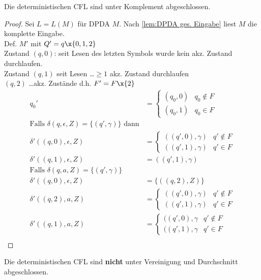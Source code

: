 \begin{Satz}[name={[Abgeschlossenheit der deterministischen \acs*{CFL}]}]
	Die deterministischen \ac{CFL} sind unter Komplement abgeschlossen.
\end{Satz}
\begin{proof}
	Sei $L=L(M)$ für \ac{DPDA} $M$. Nach \autoref{lem:DPDA ges. Eingabe} liest $M$ die komplette Eingabe.\\
	Def. $M'$ mit $Q'= q\x \{0,1,2\}$\\
	Zustand $(q,0)$: seit Lesen des letzten Symbols wurde kein akz. Zustand durchlaufen.\\
	Zustand $(q,1)$ seit Lesen \dots$\geq 1$ akz. Zustand durchlaufen\\
	\phantom{Zustand} $(q,2)$ \dots akz. Zustände d.h. $F'=F\x \{2\}$
	\begin{align*}
		q_0' &= \begin{cases}
			(q_0,0) & q_0\notin F\\
			(q_0,1) & q_0\in F
		\end{cases}\\
		\text{Falls }\delta(q,\epsilon,Z) = \{(q',\gamma)\}\text{ dann}&\\
		\delta'((q,0),\epsilon,Z) &= \begin{cases}
				((q',0),\gamma) & q'\notin F\\
				((q',1),\gamma) & q'\in F
			\end{cases}\\
		\delta'((q,1),\epsilon,Z) &= ((q',1),\gamma)\\
		\text{Falls }\delta(q,a,Z) = \{(q',\gamma)\}& \\
		\delta'((q,0), \epsilon, Z) &= \{ ((q,2), Z) \} \\
		\delta'((q,2), a, Z) &=
		    \begin{cases}
		        ((q',0), \gamma) & q' \notin F\\
		        ((q',1), \gamma) & q' \in F
		    \end{cases}\\
		\delta'((q,1), a, Z) &=
            \begin{cases}
                ((q',0), \gamma & q' \notin F\\
                ((q',1), \gamma & q' \in F
            \end{cases}
        \\ \tag*{\qedhere}
	\end{align*}
\end{proof}
\begin{Satz}
    Die deterministischen \ac{CFL} sind \textbf{nicht} unter Vereinigung und Durchschnitt abgeschlossen.
\end{Satz}

